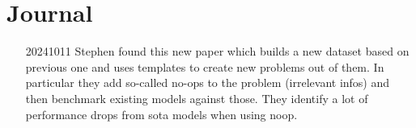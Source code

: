 \documentclass{article}
\begin{document}
\section{Journal}
\begin{itemize}
\item[20241011] Stephen found this new paper \cite{gsmsym} which builds a new dataset based on previous one and uses templates to create new problems out of them. In particular they add so-called no-ops to the problem (irrelevant infos) and then benchmark existing models against those. They identify a lot of performance drops from sota models when using noop.
\end{itemize}



\end{document}
